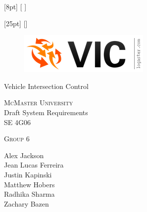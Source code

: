 \documentclass [12pt]{article}
\begin{document}

[8pt]                                               %
{}%
{\contentsmargin{2pt}                               %
\thecontentslabel {\enspace }  %
}
{\contentsmargin{0pt}\Large}                        %
{\contentspage} %
[ ] %

[25pt]                                               %
{}%
{\contentsmargin{0pt}                               %
\thecontentslabel\enspace\enspace%
}
{\contentsmargin{4pt}\large}                        %
{\contentspage} %
[] %




\begin {center} 

\thispagestyle{empty}
\vspace*{4.5cm}



\begin {figure}[h!]
\centering
\includegraphics [scale = .5, trim={.4cm 0 .8cm 0},clip] {figures/vic_logo.png}
\end {figure}

{\fontfamily{\cabinfamily}\selectfont
\Huge{Vehicle Intersection Control} }

\vspace{1 cm}
{\LARGE{\textsc{McMaster University}}\\}  \vspace {1cm}
{\Large Draft System Requirements\\ \vspace {0.5 cm} SE 4G06}  \vspace {1cm}

{\large \textsc{Group 6} \\} \vspace{1cm}

{
Alex Jackson \\
Jean Lucas Ferreira \\
Justin Kapinski\\
Matthew Hobers\\
Radhika Sharma\\
Zachary Bazen}




\end{center}
\end{document}
